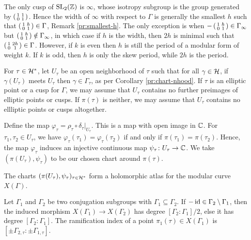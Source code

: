 \begin{rmk} \label{pr:width}
 The only cusp of $\operatorname{SL}_2(\mathbb{Z})$ is $\infty$, whose isotropy subgroup is the group generated by $\left(\begin{smallmatrix}1&1\\0&1\end{smallmatrix}\right)$. Hence the width of $\infty$ with respect to $\Gamma$ is generally the smallest $h$ such that $\left(\begin{smallmatrix}1&h\\0&1\end{smallmatrix}\right)\in\Gamma$, \cf Remark \ref{pr:smallest-h}. The only exception is when $-\left(\begin{smallmatrix}1&h\\0&1\end{smallmatrix}\right)\in\Gamma_\infty$ but $\left(\begin{smallmatrix}1&h\\0&1\end{smallmatrix}\right)\notin\Gamma_\infty$, in which case if $h$ is the width, then $2h$ is minimal such that $\left(\begin{smallmatrix}1&2h\\0&1\end{smallmatrix}\right)\in\Gamma$. However, if $k$ is even then $h$ is still the period of a modular form of weight $k$. If $k$ is odd, then $h$ is only the skew period, while $2h$ is the period.
\end{rmk}

For $\tau\in\mathcal{H}^*$, let $U_\tau$ be an open neighborhood of $\tau$ such that for all $\gamma\in\mathcal{H}$, if $\gamma(U_\tau)$ meets $U_\tau$ then $\gamma\in\Gamma_\tau$, as per Corollary \ref{pr:chart-nhood}. If $\tau$ is an elliptic point or a cusp for $\Gamma$, we may assume that $U_\tau$ contains no further preimages of elliptic points or cusps. If $\pi(\tau)$ is neither, we may assume that $U_\tau$ contains no ellliptic points or cusps altogether.

Define the map $\varphi_\tau=\rho_\tau\circ\delta_\tau|_{U_\tau}$. This is a map with open image in $\mathbb{C}$. For $\tau_1,\tau_2\in U_\tau$, we have $\varphi_\tau(\tau_1)=\varphi_\tau(\tau_2)$ if and only if $\pi(\tau_1)=\pi(\tau_2)$. Hence, the map $\varphi_\tau$ induces an injective continuous map $\psi_\tau\colon U_\tau\to\mathbb{C}$. We take $(\pi(U_\tau),\psi_\tau)$ to be our chosen chart around $\pi(\tau)$.

\begin{prop} \label{pr:charts}
 The charts $(\pi(U_\tau),\psi_\tau)_{\tau\in\mathcal{H}^*}$ form a holomorphic atlas for the modular curve $X(\Gamma)$.
\end{prop}

\begin{prop}
 Let $\Gamma_1$ and $\Gamma_2$ be two conjugation subgroups with $\Gamma_1\subseteq\Gamma_2$. If $-\operatorname{id}\in\Gamma_2\setminus\Gamma_1$, then the induced morphism $X(\Gamma_1)\to X(\Gamma_2)$ has degree $[\Gamma_2:\Gamma_1]/2$, else it has degree $[\Gamma_2:\Gamma_1]$. The ramification index of a point $\pi_1(\tau)\in X(\Gamma_1)$ is $[\pm\Gamma_{2,\tau}:\pm\Gamma_{1,\tau}]$.
\end{prop}

